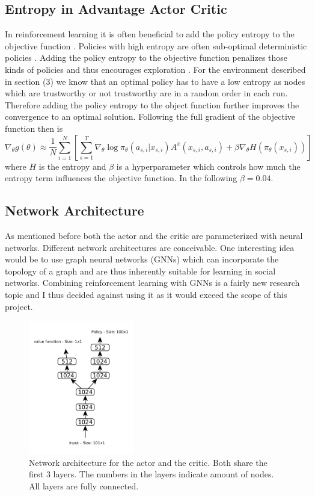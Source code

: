 \documentclass[11pt, a4paper]{article}
\begin{document}
\subsection{Entropy in Advantage Actor Critic}
In reinforcement learning it is often beneficial to add the policy entropy to the objective function \cite{entropy_1}. Policies with high entropy are often sub-optimal deterministic policies \cite{A3C_1}. Adding the policy entropy to the objective function penalizes those kinds of policies and thus encourages exploration . For the environment described in section (3) we know that an optimal policy has to have a low entropy as nodes which are trustworthy or not trustworthy are in a random order in each run. Therefore adding the policy entropy to the object function further improves the convergence to an optimal solution. Following \cite{A3C_1} the full gradient of the objective function then is
\begin{equation}
	\label{equ:pol_grad_fin}
	\nabla_\theta g(\theta) \approx \frac{1}{N} \sum_{i=1}^{N}\left[\sum_{s=1}^{T}\nabla_\theta \log \pi_\theta(a_{s,i}|x_{s,i}) A^\pi(x_{s,i},a_{s,i}) + \beta \nabla_\theta H(\pi_\theta(x_{s,i}))\right]
\end{equation}
where $H$ is the entropy and $\beta$ is a hyperparameter which controls how much the entropy term influences the objective function. In the following $\beta=0.04$.

\subsection{Network Architecture}
As mentioned before both the actor and the critic are parameterized with neural networks. Different network architectures are conceivable. One interesting idea would be to use graph neural networks (GNNs) \cite{gnn_1, gnn_2, gnn_3} which can incorporate the topology of a graph and are thus inherently suitable for learning in social networks. Combining reinforcement learning with GNNs is a fairly new research topic \cite{rl_gnn2, rl_gnn1} and I thus decided against using it as it would exceed the scope of this project. \newline

%
\begin{figure}
	\centering
	\includegraphics[width=0.41\textwidth]{NN_architecture.png}
	\caption{\label{fig:NN_arch}Network architecture for the actor and the critic. Both share the first 3 layers. The numbers in the layers indicate amount of nodes. All layers are fully connected.}
\end{figure}
%
\end{document}
